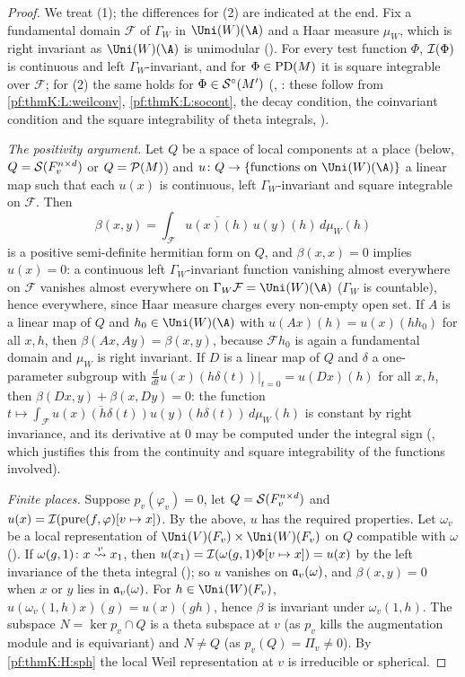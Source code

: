 \begin{proof}
We treat (1); the differences for (2) are indicated at the end. Fix a fundamental domain $\mathcal F$ of $\Gamma_W$ in
$\Uni(W)(\A)$ and a Haar measure $\mu_W$, which is right invariant as $\Uni(W)(\A)$ is unimodular
(). For every test function $\Phi$, $\mathcal{I}(\Phi)$ is continuous and left
$\Gamma_W$-invariant, and for $\Phi\in\operatorname{PD}(M)$ it is square integrable over $\mathcal F$; for (2) the same holds for
$\Phi\in\mathcal{S}^{\circ}(M')$ (, : these follow from
\ref{pf:thmK:L:weilconv}, \ref{pf:thmK:L:socont}, the decay condition, the coinvariant condition and the square
integrability of theta integrals, ).

\emph{The positivity argument.} Let $Q$ be a space of local components at a place (below, $Q=\mathcal{S}(F_v^{n\times d})$ or
$Q=\mathcal{P}(M)$) and $u\colon Q\to\{\text{functions on }\Uni(W)(\A)\}$ a linear map such that each $u(x)$ is continuous,
left $\Gamma_W$-invariant and square integrable on $\mathcal F$. Then
\[
\beta(x,y)=\int_{\mathcal F}\overline{u(x)(h)}\,u(y)(h)\,d\mu_W(h)
\]
is a positive semi-definite hermitian form on $Q$, and $\beta(x,x)=0$ implies $u(x)=0$: a continuous left
$\Gamma_W$-invariant function vanishing almost everywhere on $\mathcal F$ vanishes almost everywhere on
$\Gamma_W\mathcal F=\Uni(W)(\A)$ ($\Gamma_W$ is countable), hence everywhere, since Haar measure charges every non-empty
open set. If $A$ is a linear map of $Q$ and $h_0\in\Uni(W)(\A)$ with $u(Ax)(h)=u(x)(hh_0)$ for all $x,h$, then
$\beta(Ax,Ay)=\beta(x,y)$, because $\mathcal Fh_0$ is again a fundamental domain and $\mu_W$ is right invariant. If $D$ is a
linear map of $Q$ and $\delta$ a one-parameter subgroup with $\frac{d}{dt}u(x)(h\delta(t))|_{t=0}=u(Dx)(h)$ for all $x,h$,
then $\beta(Dx,y)+\beta(x,Dy)=0$: the function $t\mapsto\int_{\mathcal F}\overline{u(x)(h\delta(t))}u(y)(h\delta(t))\,
d\mu_W(h)$ is constant by right invariance, and its derivative at $0$ may be computed under the integral sign
(, which justifies this from the continuity and square integrability of the
functions involved).

\emph{Finite places.} Suppose $p_v(\varphi_v)=0$, let $Q=\mathcal{S}(F_v^{n\times d})$ and $u(x)=\mathcal{I}(\operatorname{pure}(f,\varphi)
[v\mapsto x])$. By the above, $u$ has the required properties. Let $\omega_v$ be a local representation of
$\Uni(V)(F_v)\times\Uni(W)(F_v)$ on $Q$ compatible with $\omega$ (). If
$\omega(g,1)\colon x\mathrel{\stackrel{v}{\leadsto}}x_1$, then $u(x_1)=\mathcal{I}(\omega(g,1)\Phi[v\mapsto x])=u(x)$ by the left invariance of
the theta integral (); so $u$ vanishes on $\mathfrak{a}_v(\omega)$, and $\beta(x,y)=0$
when $x$ or $y$ lies in $\mathfrak{a}_v(\omega)$. For $h\in\Uni(W)(F_v)$, $u(\omega_v(1,h)x)(g)=u(x)(gh)$, hence $\beta$ is
invariant under $\omega_v(1,h)$. The subspace $N=\ker p_v\cap Q$ is a theta subspace at $v$ (as $p_v$ kills the
augmentation module and is equivariant) and $N\ne Q$ (as $p_v(Q)=\Pi_v\ne0$). By \ref{pf:thmK:H:sph} the local Weil
representation at $v$ is irreducible or spherical.


\end{proof}
